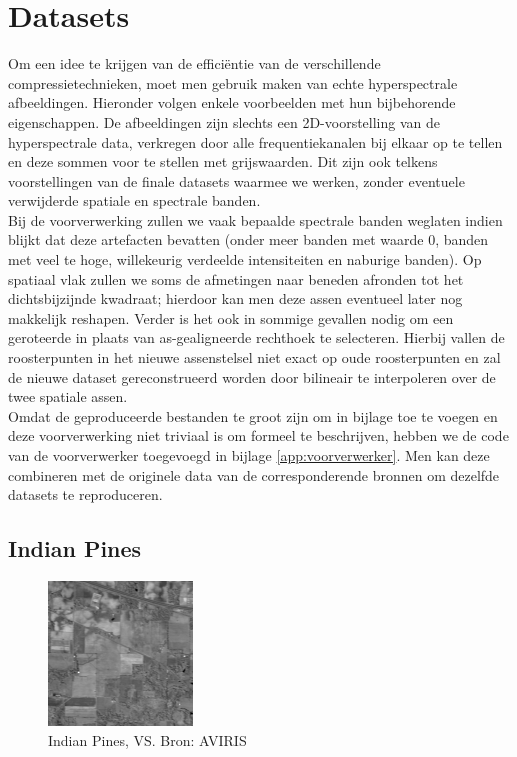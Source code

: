 \section{Datasets}

Om een idee te krijgen van de effici\"entie van de verschillende compressietechnieken, moet men gebruik maken van echte hyperspectrale afbeeldingen. Hieronder volgen enkele voorbeelden met hun bijbehorende eigenschappen. De afbeeldingen zijn slechts een 2D-voorstelling van de hyperspectrale data, verkregen door alle frequentiekanalen bij elkaar op te tellen en deze sommen voor te stellen met grijswaarden. Dit zijn ook telkens voorstellingen van de finale datasets waarmee we werken, zonder eventuele verwijderde spatiale en spectrale banden.\\

Bij de voorverwerking zullen we vaak bepaalde spectrale banden weglaten indien blijkt dat deze artefacten bevatten (onder meer banden met waarde 0, banden met veel te hoge, willekeurig verdeelde intensiteiten en naburige banden). Op spatiaal vlak zullen we soms de afmetingen naar beneden afronden tot het dichtsbijzijnde kwadraat; hierdoor kan men deze assen eventueel later nog makkelijk reshapen. Verder is het ook in sommige gevallen nodig om een geroteerde in plaats van as-gealigneerde rechthoek te selecteren. Hierbij vallen de roosterpunten in het nieuwe assenstelsel niet exact op oude roosterpunten en zal de nieuwe dataset gereconstrueerd worden door bilineair te interpoleren \cite{ref:bilinear_interpolation} over de twee spatiale assen.\\

Omdat de geproduceerde bestanden te groot zijn om in bijlage toe te voegen en deze voorverwerking niet triviaal is om formeel te beschrijven, hebben we de code van de voorverwerker toegevoegd in bijlage \ref{app:voorverwerker}. Men kan deze combineren met de originele data van de corresponderende bronnen om dezelfde datasets te reproduceren.

\subsection{Indian Pines}

\begin{figure}[H]
  \centering
  \includegraphics[scale=1]{images/indian_pines_sum.png}
  \caption{Indian Pines, VS. Bron: AVIRIS \cite{ref:ehu_aviris}}
  \label{fig:indian_pines_sum}
\end{figure}

